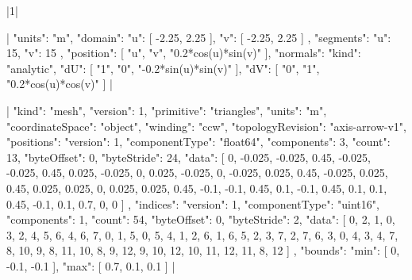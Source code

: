 \documentclass{article}
\begin{document}
\TLSetup{\usepackage{cmbright}}
|1|

|{
  "units": "m",
  "domain": {
    "u": [
      -2.25,
      2.25
    ],
    "v": [
      -2.25,
      2.25
    ]
  },
  "segments": {
    "u": 15,
    "v": 15
  },
  "position": [
    "u",
    "v",
    "0.2*cos(u)*sin(v)"
  ],
  "normals": {
    "kind": "analytic",
    "dU": [
      "1",
      "0",
      "-0.2*sin(u)*sin(v)"
    ],
    "dV": [
      "0",
      "1",
      "0.2*cos(u)*cos(v)"
    ]
  }
}|

|{
  "kind": "mesh",
  "version": 1,
  "primitive": "triangles",
  "units": "m",
  "coordinateSpace": "object",
  "winding": "ccw",
  "topologyRevision": "axis-arrow-v1",
  "positions": {
    "version": 1,
    "componentType": "float64",
    "components": 3,
    "count": 13,
    "byteOffset": 0,
    "byteStride": 24,
    "data": [
      0,
      -0.025,
      -0.025,
      0.45,
      -0.025,
      -0.025,
      0.45,
      0.025,
      -0.025,
      0,
      0.025,
      -0.025,
      0,
      -0.025,
      0.025,
      0.45,
      -0.025,
      0.025,
      0.45,
      0.025,
      0.025,
      0,
      0.025,
      0.025,
      0.45,
      -0.1,
      -0.1,
      0.45,
      0.1,
      -0.1,
      0.45,
      0.1,
      0.1,
      0.45,
      -0.1,
      0.1,
      0.7,
      0,
      0
    ]
  },
  "indices": {
    "version": 1,
    "componentType": "uint16",
    "components": 1,
    "count": 54,
    "byteOffset": 0,
    "byteStride": 2,
    "data": [
      0,
      2,
      1,
      0,
      3,
      2,
      4,
      5,
      6,
      4,
      6,
      7,
      0,
      1,
      5,
      0,
      5,
      4,
      1,
      2,
      6,
      1,
      6,
      5,
      2,
      3,
      7,
      2,
      7,
      6,
      3,
      0,
      4,
      3,
      4,
      7,
      8,
      10,
      9,
      8,
      11,
      10,
      8,
      9,
      12,
      9,
      10,
      12,
      10,
      11,
      12,
      11,
      8,
      12
    ]
  },
  "bounds": {
    "min": [
      0,
      -0.1,
      -0.1
    ],
    "max": [
      0.7,
      0.1,
      0.1
    ]
  }
}|
\end{document}
